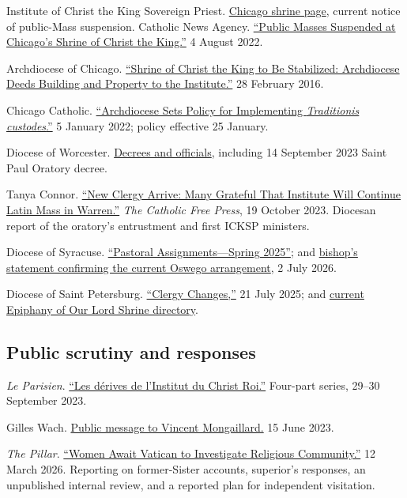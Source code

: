 Institute of Christ the King Sovereign Priest. \href{https://www.institute-christ-king.org/chicago-home}{Chicago shrine page}, current notice of public-Mass suspension. Catholic News Agency. \href{https://www.catholicnewsagency.com/news/251967/public-masses-suspended-at-chicagos-shrine-of-christ-the-king}{``Public Masses Suspended at Chicago's Shrine of Christ the King.''} 4 August 2022.

Archdiocese of Chicago. \href{https://www.archchicago.org/news-releases/-/asset_publisher/lge4tDy8ErBD/content/news-release-shrine-of-christ-the-king-to-be-stabilized-archdiocese-deeds-building-and-property-to-the-institute-of-christ-the-king-sovereign-priest}{``Shrine of Christ the King to Be Stabilized: Archdiocese Deeds Building and Property to the Institute.''} 28 February 2016.

Chicago Catholic. \href{https://www.chicagocatholic.com/chicagoland/-/article/2022/01/05/archdiocese-sets-policy-for-implementing-traditionis-custodes-}{``Archdiocese Sets Policy for Implementing \emph{Traditionis custodes}.''} 5 January 2022; policy effective 25 January.

Diocese of Worcester. \href{https://worcesterdiocese.org/decrees-and-officials}{Decrees and officials}, including 14 September 2023 Saint Paul Oratory decree.

Tanya Connor. \href{https://catholicfreepress.org/news/new-clergy-arrive-many-grateful-that-institute-will-continue-latin-mass-in-warren}{``New Clergy Arrive: Many Grateful That Institute Will Continue Latin Mass in Warren.''} \emph{The Catholic Free Press}, 19 October 2023. Diocesan report of the oratory's entrustment and first ICKSP ministers.

Diocese of Syracuse. \href{https://syracusediocese.org/news/pastoral-assignments-spring-2025}{``Pastoral Assignments---Spring 2025''}; and \href{https://syracusediocese.org/news/statement-from-bishop-douglas-j-lucia-on-sspx-vatican-decree}{bishop's statement confirming the current Oswego arrangement}, 2 July 2026.

Diocese of Saint Petersburg. \href{https://www.dosp.org/clergy-changes-july-21-2025/}{``Clergy Changes,''} 21 July 2025; and \href{https://www.dosp.org/parishes/epiphany-of-our-lord-shrine-tampa/}{current Epiphany of Our Lord Shrine directory}.

\subsection{Public scrutiny and responses}

\emph{Le Parisien}. \href{https://www.leparisien.fr/societe/religions/derives-institut-du-christ-roi/}{``Les dérives de l'Institut du Christ Roi.''} Four-part series, 29--30 September 2023.

Gilles Wach. \href{https://www.icrsp.org/conferences/Mgr/Mgr_LettreMontgaillard_20230615}{Public message to Vincent Mongaillard.} 15 June 2023.

\emph{The Pillar}. \href{https://www.pillarcatholic.com/p/you-just-feel-so-defeated-women-await}{``Women Await Vatican to Investigate Religious Community.''} 12 March 2026. Reporting on former-Sister accounts, superior's responses, an unpublished internal review, and a reported plan for independent visitation.
